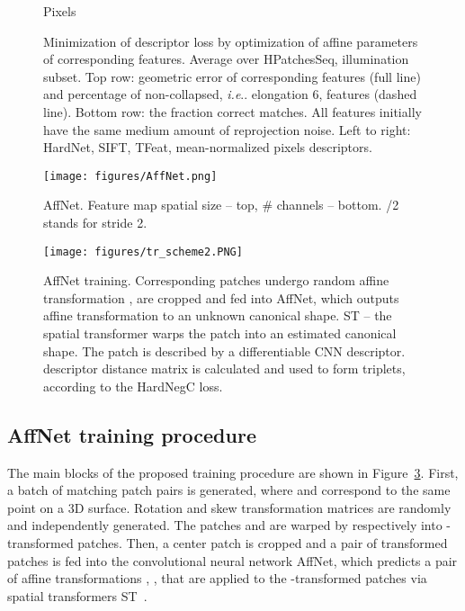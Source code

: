 \documentclass[runningheads]{llncs}
\makeatletter
\DeclareRobustCommand\onedot{\futurelet\@let@token\@onedot}
\def\@onedot{\ifx\@let@token.\else.\null\fi\xspace}
\def\ie{\emph{i.e}\onedot} \def\Ie{\emph{I.e}\onedot}
\makeatother
\begin{document}
\begin{figure}[htb]
\begin{minipage}[h]{0.24\linewidth}
\end{minipage}
\hfill
\begin{minipage}[h]{0.24\linewidth}
 Pixels \\
\end{minipage} \caption{Minimization of descriptor loss by optimization of affine parameters of corresponding features. Average over HPatchesSeq, illumination subset. Top row: geometric error of corresponding features (full line)  and percentage of non-collapsed, \ie elongation  6, features (dashed line). Bottom row: the fraction correct matches.
 All features initially have the same medium amount of reprojection noise.  Left to right: HardNet, SIFT, TFeat, mean-normalized pixels descriptors.}
 \label{fig:direct-opt-random}
 \end{figure}\begin{figure}[t]\centering
 \texttt{[image: figures/AffNet.png]}\\
 \caption{AffNet. Feature map spatial size -- top, \# channels -- bottom. /2 stands for stride 2.}
 \label{fig:architecture}
\end{figure}\begin{figure}[htb]\centering
\texttt{[image: figures/tr\_scheme2.PNG]}
 \caption{AffNet training. Corresponding patches undergo random affine transformation , are cropped and fed into AffNet, which outputs affine transformation  to an unknown canonical shape. ST -- the spatial transformer warps the patch into an estimated canonical shape. The patch is described by a differentiable CNN descriptor.  descriptor distance matrix is calculated and used to form triplets, according to the HardNegC loss.}
\label{fig:training-scheme}
\end{figure}\subsection{AffNet training procedure}The main blocks of the proposed training procedure are shown in Figure~\ref{fig:training-scheme}. 
First, a batch of matching patch pairs  is generated, where  and  correspond to the same point on a 3D surface. Rotation and skew transformation matrices  are randomly and independently generated. The patches  and  are warped by   respectively into -transformed patches. Then, a  center patch is cropped and a pair of transformed patches is fed into the convolutional neural network AffNet, which predicts a pair of affine transformations , , that are applied to the -transformed patches via spatial transformers ST~\cite{SpatialTransformers2015}. 
\end{document}
